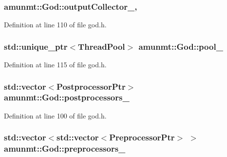 \subsubsection[{\texorpdfstring{output\+Collector\+\_\+}{outputCollector_}}]{ amunmt\+::\+God\+::output\+Collector\+\_\+\hspace{0.3cm}{\ttfamily [mutable]}, {\ttfamily [private]}}\hypertarget{classamunmt_1_1God_a2dc4151a17c691e86bab1f2cc1d0a932}{}\label{classamunmt_1_1God_a2dc4151a17c691e86bab1f2cc1d0a932}


Definition at line 110 of file god.\+h.

\subsubsection[{\texorpdfstring{pool\+\_\+}{pool_}}]{\setlength{\rightskip}{0pt plus 5cm}std\+::unique\+\_\+ptr$<${\bf Thread\+Pool}$>$ amunmt\+::\+God\+::pool\+\_\+\hspace{0.3cm}{\ttfamily [private]}}\hypertarget{classamunmt_1_1God_a93baaad747946f9e25f35383f65c3981}{}\label{classamunmt_1_1God_a93baaad747946f9e25f35383f65c3981}


Definition at line 115 of file god.\+h.

\subsubsection[{\texorpdfstring{postprocessors\+\_\+}{postprocessors_}}]{\setlength{\rightskip}{0pt plus 5cm}std\+::vector$<${\bf Postprocessor\+Ptr}$>$ amunmt\+::\+God\+::postprocessors\+\_\+\hspace{0.3cm}{\ttfamily [private]}}\hypertarget{classamunmt_1_1God_aef3af265dadb03728481dda039df6e26}{}\label{classamunmt_1_1God_aef3af265dadb03728481dda039df6e26}


Definition at line 100 of file god.\+h.

\subsubsection[{\texorpdfstring{preprocessors\+\_\+}{preprocessors_}}]{\setlength{\rightskip}{0pt plus 5cm}std\+::vector$<$std\+::vector$<${\bf Preprocessor\+Ptr}$>$ $>$ amunmt\+::\+God\+::preprocessors\+\_\+\hspace{0.3cm}{\ttfamily [private]}}\hypertarget{classamunmt_1_1God_a609e290d29732005f6ce09a1e8c3a698}{}\label{classamunmt_1_1God_a609e290d29732005f6ce09a1e8c3a698}


